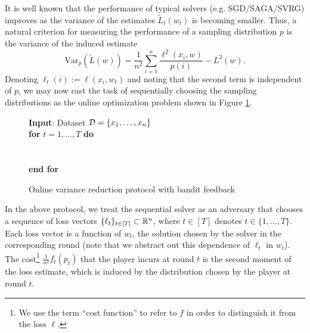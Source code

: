 It is well known that the performance of typical solvers (e.g.  SGD/SAGA/SVRG) improves as the variance of the estimates $\tilde{L}_t(w_t)$ is becoming smaller.
Thus, a natural criterion for measuring the performance of a sampling distribution $p$ is the variance of the induced estimate
\begin{equation*}
\text{Var}_p(\tilde{L}(w)) = \frac{1}{n^2} \sum_{i=1}^n \frac{\ell^2 (x_i, w)}{p(i)} - L^2(w).
\end{equation*}
Denoting $\ell_t(i):=\ell (x_i, w_t)$ and noting that the second term is independent of $p$, we may now cast the task of sequentially choosing the sampling distributions as the  online optimization problem shown in Figure \ref{fig:Protocal_bandit}.
\begin{figure}[h]
\begin{framed}
 \flushleft
 \textbf{Input}: Dataset ${\mathcal{D}} = \{x_1,\ldots,x_n\}$ \\
   \textbf{for} $t=1,\ldots, T$ \textbf{do} \\
   \\
    \\
      \textbf{end for} \\
\end{framed}
\caption{Online variance reduction protocol with bandit feedback}
\vspace{-0.2cm}
\label{fig:Protocal_bandit}
\end{figure}
In the above protocol, we treat the sequential solver as an adversary that chooses a sequence of loss vectors $\{ \ell_t\}_{t\in[T]}\subset {\mathbb R}^n$, where $t\in[T]$ denotes $t \in \{ 1, \dots, T\}$. Each loss vector is a function of $w_t$, the solution chosen by the solver in the corresponding round (note that we abstract out this dependence of $\ell_t$ in $w_t$).
The cost\footnote{We use the term ``cost function'' to refer to $f$ in order to distinguish it from the loss $\ell$.} $\frac{1}{n^2}f_t(p_t)$ that the player incurs at  round $t$ is the second moment of the  loss estimate, which is induced by  the distribution chosen by the player at round $t$.

